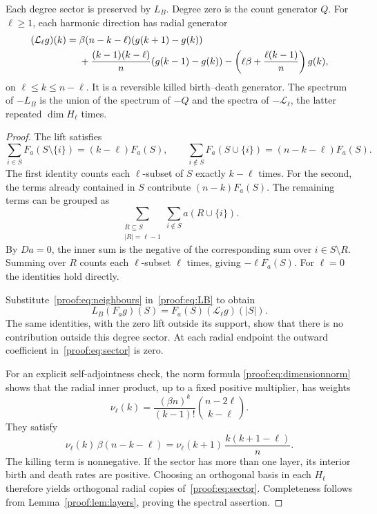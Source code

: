 \begin{lemma}\label{proof:lem:sectoraction}
Each degree sector is preserved by $L_B$. Degree zero is the count
generator $Q$. For $\ell\geq1$, each harmonic direction has radial
generator
\begin{align}
 (\mathcal L_\ell g)(k)
 ={}&\beta(n-k-\ell)(g(k+1)-g(k))\notag\\
 &+\frac{(k-1)(k-\ell)}n(g(k-1)-g(k))
  -\left(\ell\beta+\frac{\ell(k-1)}n\right)g(k),
 \label{proof:eq:sector}
\end{align}
on $\ell\leq k\leq n-\ell$. It is a reversible killed birth--death
generator. The spectrum of $-L_B$ is the union of the spectrum of
$-Q$ and the spectra of $-\mathcal L_\ell$, the latter repeated
$\dim H_\ell$ times.
\end{lemma}

\begin{proof}
The lift satisfies
\begin{equation}\label{proof:eq:neighbours}
 \sum_{i\in S}F_a(S\setminus\{i\})=(k-\ell)F_a(S),
 \qquad
 \sum_{i\notin S}F_a(S\cup\{i\})=(n-k-\ell)F_a(S).
\end{equation}
The first identity counts each $\ell$-subset of $S$ exactly $k-\ell$
times. For the second, the terms already contained in $S$ contribute
$(n-k)F_a(S)$. The remaining terms can be grouped as
\[
 \sum_{\substack{R\subseteq S\\|R|=\ell-1}}
 \sum_{i\notin S}a(R\cup\{i\}).
\]
By $Da=0$, the inner sum is the negative of the corresponding sum
over $i\in S\setminus R$. Summing over $R$ counts each
$\ell$-subset $\ell$ times, giving $-\ell F_a(S)$. For $\ell=0$
the identities hold directly.

Substitute~\eqref{proof:eq:neighbours} in~\eqref{proof:eq:LB} to obtain
\[
 L_B(F_ag)(S)=F_a(S)(\mathcal L_\ell g)(|S|).
\]
The same identities, with the zero lift outside its support, show
that there is no contribution outside this degree sector. At each
radial endpoint the outward coefficient in~\eqref{proof:eq:sector} is zero.

For an explicit self-adjointness check, the norm formula
\eqref{proof:eq:dimensionnorm} shows that the radial inner product,
up to a fixed positive multiplier, has weights
\begin{equation}\label{proof:eq:sectorweights}
 \nu_\ell(k)=\frac{(\beta n)^k}{(k-1)!}
               \binom{n-2\ell}{k-\ell}.
\end{equation}
They satisfy
\[
 \nu_\ell(k)\,\beta(n-k-\ell)
 =\nu_\ell(k+1)\,\frac{k(k+1-\ell)}n.
\]
The killing term is nonnegative. If the sector has more than one
layer, its interior birth and death rates are positive. Choosing an
orthogonal basis in each $H_\ell$ therefore yields orthogonal radial
copies of~\eqref{proof:eq:sector}. Completeness follows from
Lemma~\ref{proof:lem:layers}, proving the spectral assertion.
\end{proof}

